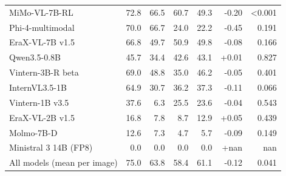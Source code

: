 \begin{table}[t]
\begin{tabular}{lrrrrrr}
MiMo-VL-7B-RL & 72.8 & 66.5 & 60.7 & 49.3 & -0.20 & <0.001 \\
Phi-4-multimodal & 70.0 & 66.7 & 24.0 & 22.2 & -0.45 & 0.191 \\
EraX-VL-7B v1.5 & 66.8 & 49.7 & 50.9 & 49.8 & -0.08 & 0.166 \\
Qwen3.5-0.8B & 45.7 & 34.4 & 42.6 & 43.1 & +0.01 & 0.827 \\
Vintern-3B-R beta & 69.0 & 48.8 & 35.0 & 46.2 & -0.05 & 0.401 \\
InternVL3.5-1B & 64.9 & 30.7 & 36.2 & 37.3 & -0.11 & 0.066 \\
Vintern-1B v3.5 & 37.6 & 6.3 & 25.5 & 23.6 & -0.04 & 0.543 \\
EraX-VL-2B v1.5 & 16.8 & 7.8 & 8.7 & 12.9 & +0.05 & 0.439 \\
Molmo-7B-D & 12.6 & 7.3 & 4.7 & 5.7 & -0.09 & 0.149 \\
Ministral 3 14B (FP8) & 0.0 & 0.0 & 0.0 & 0.0 & +nan & nan \\
All models (mean per image) & 75.0 & 63.8 & 58.4 & 61.1 & -0.12 & 0.041 \\
\bottomrule
\end{tabular}
\par{}
\end{table}

